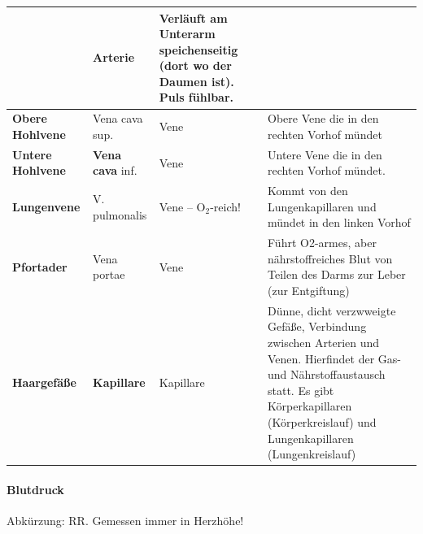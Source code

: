 \documentclass{article}
\newcommand\gSub[1]{\ensuremath{{}_{\text{#1}}}}
\newcommand\gEs[1]{\textbf{\textcolor[rgb]{0.0,0.0,0.5019608}{#1}}}
\newcommand\gEs[1]{\textbf{\textcolor[rgb]{0.0,0.0,0.5019608}{#1}}}
\newcommand\gT[1]{\textbf{\textup{\textcolor[rgb]{0.0,0.5019608,0.0}{#1}}}}
\newcommand\gZ[1]{\textcolor[rgb]{0.5019608,0.5019608,0.5019608}{#1}}
\begin{document}
\begin{center}
\begin{supertabular}{|m{2.728cm}|m{2.728cm}|m{2.728cm}|m{4.721cm}|}
 &
{\mdseries Arterie}

 &
{\mdseries Verl\"auft am Unterarm speichenseitig (dort wo der Daumen
ist). Puls f\"uhlbar.}

\\\hline
{\mdseries \gEs{Obere Hohlvene}}

 &
{\mdseries \gZ{Vena cava sup.}}

 &
{\mdseries Vene}

 &
{\mdseries Obere Vene die in den rechten Vorhof m\"undet}

\\\hline
{\mdseries \gEs{Untere Hohlvene}}

 &
{\mdseries \gT{Vena cava}\gZ{ inf.}}

 &
{\mdseries Vene}

 &
{\mdseries Untere Vene die in den rechten Vorhof m\"undet. }

\\\hline
{\mdseries \gEs{Lungenvene}}

 &
{\mdseries \gZ{V. pulmonalis}}

 &
{\mdseries Vene -- O\gSub{2}{}-reich! }

 &
{\mdseries Kommt von den Lungenkapillaren und m\"undet in den linken
Vorhof}

\\\hline
{\mdseries \gEs{Pfortader}}

 &
{\mdseries \gZ{Vena portae}}

 &
{\mdseries Vene}

 &
{\mdseries F\"uhrt O2-armes, aber n\"ahrstoffreiches Blut von Teilen des
Darms zur Leber (zur Entgiftung)}

\\\hline
{\mdseries \gEs{Haargef\"a{\ss}e}}

 &
{\mdseries \gT{Kapillare}}

 &
{\mdseries Kapillare}

 &
{\mdseries D\"unne, dicht verzwweigte Gef\"a{\ss}e, Verbindung zwischen
Arterien und Venen. Hierfindet der Gas- und N\"ahrstoffaustausch statt.
Es gibt K\"orperkapillaren (K\"orperkreislauf) und Lungenkapillaren
(Lungenkreislauf)}

\\\hline
\end{supertabular}
\end{center}
\paragraph{Blutdruck }
{\mdseries
Abk\"urzung: RR. Gemessen immer in Herzh\"ohe!}
\end{document}
